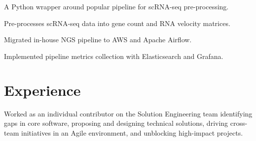\documentclass[]{resume}
\begin{document}
\begin{minipage}[t]{0.69\textwidth}
\begin{tightemize}
\item A Python wrapper around popular pipeline for scRNA-seq pre-processing.
\item Pre-processes scRNA-seq data into gene count and RNA velocity matrices.
\end{tightemize}
\sectionsep

\begin{tightemize}
\item Migrated in-house NGS pipeline to AWS and Apache Airflow.
\item Implemented pipeline metrics collection with Elasticsearch and Grafana.
\end{tightemize}
\sectionsep


\section{Experience}
Worked as an individual contributor on the Solution Engineering team identifying gaps in core software, proposing and designing technical solutions, driving cross-team initiatives in an Agile environment, and unblocking high-impact projects.
\sectionsep


\end{minipage}
\end{document}
